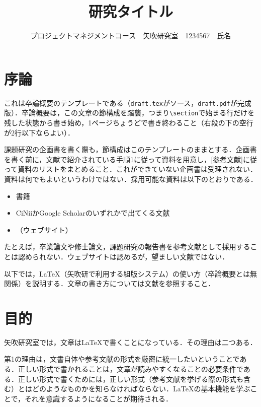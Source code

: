 \documentclass[uplatex,twocolumn,dvipdfmx]{jsarticle}
\title{\vspace{-5mm}\fontsize{14pt}{0pt}\selectfont 研究タイトル}
\author{\normalsize プロジェクトマネジメントコース　矢吹研究室　1234567　氏名}
\date{}
\begin{document}
\fontsize{10.5pt}{\baselineskip}\selectfont
\maketitle





\section{序論}\label{序論}

これは卒論概要のテンプレートである（\verb|draft.tex|がソース，\verb|draft.pdf|が完成版）．卒論概要は，この文章の節構成を踏襲，つまり\verb|\section|で始まる行だけを残した状態から書き始め，1ページちょうどで書き終わること（右段の下の空行が2行以下ならよい）．

課題研究の企画書を書く際も，節構成はこのテンプレートのままとする．企画書を書く前に，文献\cite{アイデアのつくり方}で紹介されている手順1に従って資料を用意し，\ref{参考文献}に従って資料のリストをまとめること．これができていない企画書は受理されない．資料は何でもよいというわけではない．採用可能な資料は以下のとおりである．

\begin{itemize}
\item 書籍
\item CiNiiかGoogle Scholarのいずれかで出てくる文献
\item （ウェブサイト）
\end{itemize}

たとえば，卒業論文や修士論文，課題研究の報告書を参考文献として採用することは認められない．ウェブサイトは認めるが，望ましい文献ではない．

以下では，\LaTeX （矢吹研で利用する組版システム）の使い方（卒論概要とは無関係）を説明する．文章の書き方については文献\cite{書く技術}を参照すること．

\section{目的}

矢吹研究室では，文章は\LaTeX で書くことになっている．その理由は二つある．

第1の理由は，文書自体や参考文献の形式を厳密に統一したいということである．正しい形式で書かれることは，文章が読みやすくなることの必要条件である．正しい形式で書くためには，正しい形式（参考文献を挙げる際の形式も含む）とはどのようなものかを知らなければならない．\LaTeX の基本機能を学ぶことで，それを意識するようになることが期待される．
\end{document}
